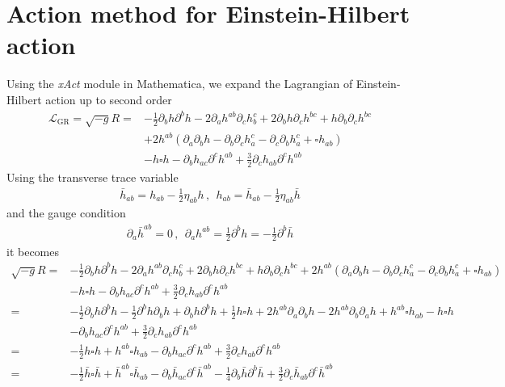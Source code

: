 \documentclass[
 jor,
 amsmath,amssymb,preprint,
]{revtex4-2}
\begin{document}
\section{Action method for Einstein-Hilbert action}
Using the \textit{xAct} module in Mathematica, we expand the Lagrangian of Einstein-Hilbert action up to second order
\begin{equation}
\begin{aligned}
\mathcal{L}_{\mathrm{GR}} = \sqrt{-g}R = & -\frac{1}{2}\partial_b h \partial^b h - 2\partial_a h^{ab}\partial_c h^c_b + 2\partial_b h\partial_c h^{bc} + h\partial_b\partial_c h^{bc} \\
& + 2h^{ab}(\partial_a\partial_b h-\partial_b\partial_c h^c_a - \partial_c\partial_b h^c_a + \square h_{ab})\\
& - h \square h - \partial_b h_{ac}\partial^c h^{ab} + \frac{3}{2}\partial_c h_{ab}\partial^c h^{ab}
\end{aligned}
\end{equation}
Using the transverse trace variable 
\begin{align}
\bar{h}_{ab} = h_{ab} - \frac{1}{2}\eta_{ab}h\,,~~h_{ab} = \bar{h}_{ab} - \frac{1}{2}\eta_{ab}\bar{h}
\end{align}
and the gauge condition
\begin{align}
\partial_a \bar{h}^{ab} = 0\,,~~\partial_ah^{ab} = \frac{1}{2} \partial^b h=-\frac{1}{2}\partial^b\bar{h}
\end{align}
it becomes 
\begin{equation}
\begin{aligned}
\sqrt{-g}R = & -\frac{1}{2}\partial_b h \partial^b h - 2\partial_a h^{ab}\partial_c h^c_b + 2\partial_b h\partial_c h^{bc} + h\partial_b\partial_c h^{bc} + 2h^{ab}(\partial_a\partial_b h-\partial_b\partial_c h^c_a - \partial_c\partial_b h^c_a + \square h_{ab})\\
& - h \square h - \partial_b h_{ac}\partial^c h^{ab} + \frac{3}{2}\partial_c h_{ab}\partial^c h^{ab} \\
= & -\frac{1}{2}\partial_bh\partial^b h - \frac{1}{2}\partial^bh\partial_bh + \partial_bh\partial^bh + \frac{1}{2} h\square h + 2h^{ab}\partial_a\partial_b h - 2h^{ab}\partial_b\partial_a h + h^{ab}\square h_{ab} - h\square h\\
& - \partial_b h_{ac}\partial^c h^{ab} + \frac{3}{2}\partial_c h_{ab}\partial^c h^{ab}\\
= & -\frac{1}{2} h\square h + h^{ab}\square h_{ab} - \partial_b h_{ac}\partial^c h^{ab} + \frac{3}{2}\partial_c h_{ab}\partial^c h^{ab} \\
= & -\frac{1}{2} \bar{h}\square \bar{h} + \bar{h}^{ab}\square \bar{h}_{ab} - \partial_b \bar{h}_{ac}\partial^c \bar{h}^{ab} - \frac{1}{4}\partial_b\bar{h} \partial^b\bar{h} + \frac{3}{2}\partial_c \bar{h}_{ab}\partial^c \bar{h}^{ab}
\end{aligned}
\end{equation}
\end{document}
